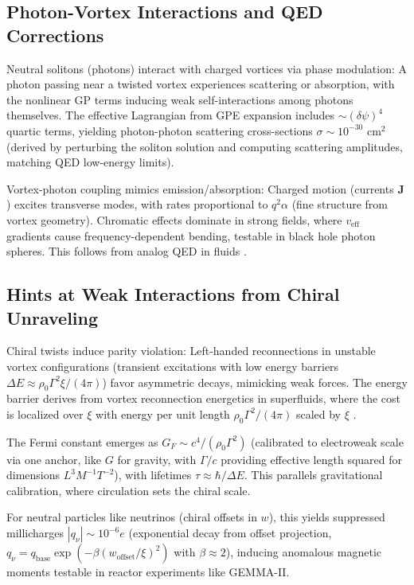 \documentclass{article}
\begin{document}
\subsection{Photon-Vortex Interactions and QED Corrections}

Neutral solitons (photons) interact with charged vortices via phase modulation: A photon passing near a twisted vortex experiences scattering or absorption, with the nonlinear GP terms inducing weak self-interactions among photons themselves. The effective Lagrangian from GPE expansion includes $\sim (\delta \psi)^4$ quartic terms, yielding photon-photon scattering cross-sections $\sigma \sim 10^{-30}$ cm$^2$ (derived by perturbing the soliton solution and computing scattering amplitudes, matching QED low-energy limits).

Vortex-photon coupling mimics emission/absorption: Charged motion (currents $\mathbf{J}$) excites transverse modes, with rates proportional to $q^2 \alpha$ (fine structure from vortex geometry). Chromatic effects dominate in strong fields, where $v_{\text{eff}}$ gradients cause frequency-dependent bending, testable in black hole photon spheres. This follows from analog QED in fluids \cite{garay2000sonic}.

\subsection{Hints at Weak Interactions from Chiral Unraveling}

Chiral twists induce parity violation: Left-handed reconnections in unstable vortex configurations (transient excitations with low energy barriers $\Delta E \approx \rho_0 \Gamma^2 \xi /(4\pi)$) favor asymmetric decays, mimicking weak forces. The energy barrier derives from vortex reconnection energetics in superfluids, where the cost is localized over $\xi$ with energy per unit length $\rho_0 \Gamma^2 /(4\pi)$ scaled by $\xi$ \cite{bewley2008characterization}.

The Fermi constant emerges as $G_F \sim c^4 / (\rho_0 \Gamma^2)$ (calibrated to electroweak scale via one anchor, like $G$ for gravity, with $\Gamma / c$ providing effective length squared for dimensions $L^3 M^{-1} T^{-2}$), with lifetimes $\tau \approx \hbar / \Delta E$. This parallels gravitational calibration, where circulation sets the chiral scale.

For neutral particles like neutrinos (chiral offsets in $w$), this yields suppressed millicharges $|q_\nu| \sim 10^{-6} e$ (exponential decay from offset projection, $q_\nu = q_{\text{base}} \exp(- \beta (w_{\text{offset}} / \xi)^2)$ with $\beta \approx 2$), inducing anomalous magnetic moments testable in reactor experiments like GEMMA-II.
\end{document}

